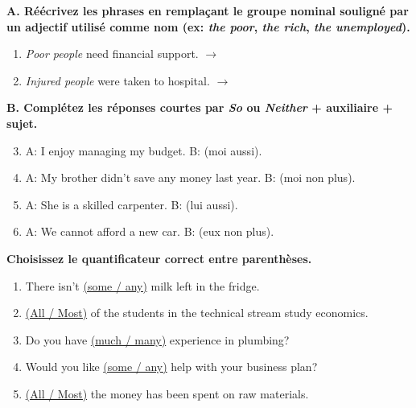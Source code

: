 \documentclass[11pt]{article}
\begin{document}
\begin{exercice}
\textbf{A. Réécrivez les phrases en remplaçant le groupe nominal souligné par un adjectif utilisé comme nom (ex: \textit{the poor}, \textit{the rich}, \textit{the unemployed}).}\\
\begin{enumerate}
    \item \textit{Poor people} need financial support. $\rightarrow$ \underline{\hspace{5cm}}
    \item \textit{Injured people} were taken to hospital. $\rightarrow$ \underline{\hspace{5cm}}
\end{enumerate}
\textbf{B. Complétez les réponses courtes par \textit{So} ou \textit{Neither} + auxiliaire + sujet.}
\begin{enumerate}\setcounter{enumi}{2}
    \item A: I enjoy managing my budget. B: \underline{\hspace{4cm}} (moi aussi).
    \item A: My brother didn't save any money last year. B: \underline{\hspace{4cm}} (moi non plus).
    \item A: She is a skilled carpenter. B: \underline{\hspace{4cm}} (lui aussi).
    \item A: We cannot afford a new car. B: \underline{\hspace{4cm}} (eux non plus).
\end{enumerate}
\end{exercice}

\begin{exercice}
\textbf{Choisissez le quantificateur correct entre parenthèses.}
\begin{enumerate}
    \item There isn't \underline{(some / any)} milk left in the fridge.
    \item \underline{(All / Most)} of the students in the technical stream study economics.
    \item Do you have \underline{(much / many)} experience in plumbing?
    \item Would you like \underline{(some / any)} help with your business plan?
    \item \underline{(All / Most)} the money has been spent on raw materials.
\end{enumerate}
\end{exercice}
\end{document}
